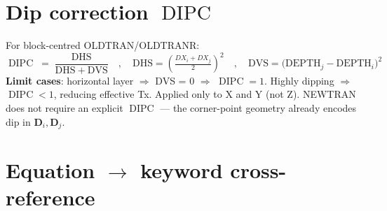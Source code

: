 \documentclass[11pt,a4paper]{article}
\DeclareMathOperator{\DIPC}{DIPC}
\begin{document}
\section{Dip correction $\DIPC$}
For block-centred OLDTRAN/OLDTRANR:
\begin{equation}
\DIPC \;=\; \frac{\mathrm{DHS}}{\mathrm{DHS}+\mathrm{DVS}}
\quad,\quad
\mathrm{DHS} = \left(\tfrac{DX_i + DX_j}{2}\right)^{2}
\quad,\quad
\mathrm{DVS} = \bigl(\mathrm{DEPTH}_j - \mathrm{DEPTH}_i\bigr)^{2}
\label{eq:dipc-full}
\tag{TD 2.4/2.10}
\end{equation}
\textbf{Limit cases}: horizontal layer $\Rightarrow$ DVS = 0 $\Rightarrow$ $\DIPC = 1$. Highly dipping
$\Rightarrow$ $\DIPC < 1$, reducing effective Tx. Applied only to X and Y (not Z).
NEWTRAN does not require an explicit $\DIPC$ — the corner-point geometry already encodes dip in
$\mathbf{D}_i, \mathbf{D}_j$.

\section{Equation \(\to\) keyword cross-reference}
\end{document}

